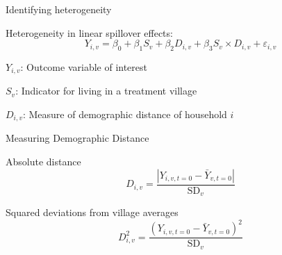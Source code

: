 \documentclass[14pt, aspectratio=169]{beamer}
\newenvironment{wideitemize}{\itemize\addtolength{\itemsep}{10pt}}{\enditemize}
\let\OLDitemize\itemize
\renewcommand\itemize{\OLDitemize\addtolength{\itemsep}{10pt}}
\begin{document}
\begin{frame}{Identifying heterogeneity}
\begin{wideitemize}
	\item Heterogeneity in linear spillover effects:
	\begin{equation*} \label{eq:interaction}
	Y_{i,v} = \beta_0 + \beta_1 S_v + \beta_2 D_{i,v} + \beta_3 S_v \times  D_{i,v} + \varepsilon_{i,v}
	\end{equation*}

	\item $Y_{i,v}$: Outcome variable of interest
    \item $S_v$: Indicator for living in a treatment village
    \item $D_{i,v}$: Measure of demographic distance of household $i$

\end{wideitemize}
\end{frame}

\begin{frame}{Measuring Demographic Distance}
\begin{wideitemize}
	\item Absolute distance
	$$D_{i,v}  = \frac{|Y_{i,v,t=0} - \bar Y_{v,t=0}|}{\text{SD}_v} $$
	\item Squared deviations from village averages
	$$ D^2_{i,v}= \frac{(Y_{i,v,t=0} - \bar Y_{v,t=0})^2}{\text{SD}_v} $$
\end{wideitemize}
\end{frame}
\end{document}
